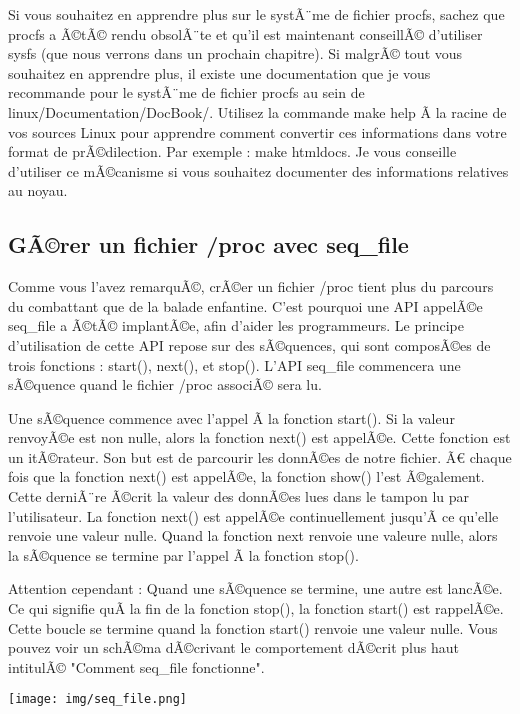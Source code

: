 \documentclass[11pt]{article}
\begin{document}
Si vous souhaitez en apprendre plus sur le systÃ¨me de fichier procfs, sachez que procfs a Ã©tÃ© rendu obsolÃ¨te et qu'il est maintenant conseillÃ© d'utiliser sysfs (que nous verrons dans un prochain chapitre). Si malgrÃ© tout vous souhaitez en apprendre plus, il existe une documentation que je vous recommande pour le systÃ¨me de fichier procfs au sein de linux/Documentation/DocBook/. Utilisez la commande make help Ã  la racine de vos sources Linux pour apprendre comment convertir ces informations dans votre format de prÃ©dilection. Par exemple : make htmldocs. Je vous conseille d'utiliser ce mÃ©canisme si vous souhaitez documenter des informations relatives au noyau.

\subsection*{GÃ©rer un fichier /proc avec seq\_file}
\label{sec-7-3}

Comme vous l'avez remarquÃ©, crÃ©er un fichier /proc tient plus du parcours du combattant que de la balade enfantine. C'est pourquoi une API appelÃ©e seq\_file a Ã©tÃ© implantÃ©e, afin d'aider les programmeurs. Le principe d'utilisation de cette API repose sur des sÃ©quences, qui sont composÃ©es de trois fonctions : start(), next(), et stop(). L'API seq\_file commencera une sÃ©quence quand le fichier /proc associÃ© sera lu.

Une sÃ©quence commence avec l'appel Ã  la fonction start(). Si la valeur renvoyÃ©e est non nulle, alors la fonction next() est appelÃ©e. Cette fonction est un itÃ©rateur. Son but est de parcourir les donnÃ©es de notre fichier. Ã€ chaque fois que la fonction next() est appelÃ©e, la fonction show() l'est Ã©galement. Cette derniÃ¨re Ã©crit la valeur des donnÃ©es lues dans le tampon lu par l'utilisateur. La fonction next() est appelÃ©e continuellement jusqu'Ã  ce qu'elle renvoie une valeur nulle. Quand la fonction next renvoie une valeure nulle, alors la sÃ©quence se termine par l'appel Ã  la fonction stop().

Attention cependant : Quand une sÃ©quence se termine, une autre est lancÃ©e. Ce qui signifie quÃ  la fin de la fonction stop(), la fonction start() est rappelÃ©e. Cette boucle se termine quand la fonction start() renvoie une valeur nulle. Vous pouvez voir un schÃ©ma dÃ©crivant le comportement dÃ©crit plus haut intitulÃ© "Comment seq\_file fonctionne".

\texttt{[image: img/seq\_file.png]}
\end{document}
